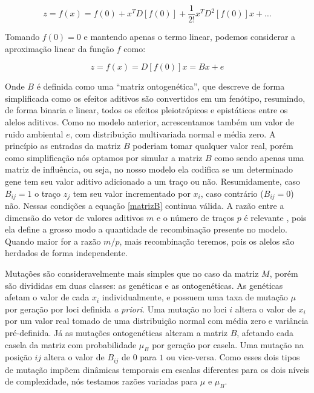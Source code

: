 \begin{equation}
z = f(x) = f(0) + x^T D[f(0)] + \frac{1}{2!} x^T D^2 [f(0)] x + \ldots
\end{equation}

Tomando $f(0) = 0$ e mantendo apenas o termo linear, podemos considerar
a aproximação linear da função $f$ como:

\begin{equation}
z = f(x) = D[f(0)]x = Bx + e
\label{matrizB}
\end{equation}

Onde $B$ é definida como uma ``matriz ontogenética'', que descreve de
forma simplificada como os efeitos aditivos são convertidos em um
fenótipo, resumindo, de forma binaria e linear, todos os efeitos
pleiotrópicos e epistáticos entre os alelos aditivos.
Como no modelo anterior, acrescentamos também um valor de ruido
ambiental $e$, com distribuição multivariada normal e média zero.
A princípio as entradas da matriz $B$ poderiam tomar qualquer valor
real, porém como simplificação nós optamos por simular a matriz $B$ como
sendo apenas uma matriz de influência, ou seja, no nosso modelo ela
codifica se um determinado gene tem seu valor aditivo adicionado a um
traço ou não.
Resumidamente, caso $B_{ij} = 1$ o traço $z_j$ tem seu valor
incrementado por $x_i$, caso contrário ($B_{ij} = 0$) não.
Nessas condições a equação \ref{matrizB} continua válida.
A razão entre a dimensão do vetor de valores aditivos $m$ e o número de
traços $p$ é relevante \citep{Wagner1984}, pois ela define a grosso modo
a quantidade de recombinação presente no modelo.
Quando maior for a razão $m/p$, mais recombinação teremos, pois os
alelos são herdados de forma independente.

Mutações são consideravelmente mais simples que no caso da
matriz $M$, porém são divididas em duas classes: as genéticas e as
ontogenéticas.
As genéticas afetam o valor de cada $x_i$ individualmente, e possuem uma
taxa de mutação $\mu$ por geração por loci definida {\it a priori}.
Uma mutação no loci $i$ altera o valor de $x_i$ por um valor real tomado
de uma distribuição normal com média zero e variância pré-definida.
Já as mutações ontogenéticas alteram a matriz $B$, afetando cada casela
da matriz com probabilidade $\mu_B$ por geração por casela.
Uma mutação na posição $ij$ altera o valor de $B_{ij}$ de $0$ para $1$
ou vice-versa.
Como esses dois tipos de mutação impõem dinâmicas temporais em escalas
diferentes para os dois níveis de complexidade, nós testamos razões
variadas para $\mu$ e $\mu_B$.

